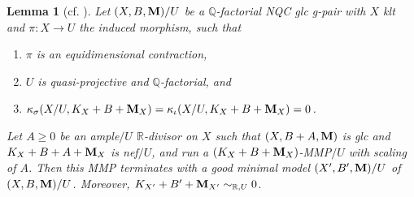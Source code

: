\documentclass[11pt]{amsart}
\numberwithin{equation}{section}
\newcommand{\Mm}{{\bf{M}}}
\newcommand{\Qq}{\mathbb{Q}}
\newcommand{\Rr}{\mathbb{R}}
\newtheorem{lem}[thm]{Lemma}
\theoremstyle{definition}
\theoremstyle{definition}
\theoremstyle{definition}
\begin{document}
\begin{lem}[{cf. \cite[Version 2, Lemma 4.9]{HL21}}]\label{lem: has19 3.2 step 3 abu ver}
Let $(X,B,\Mm)/U$ be a $\Qq$-factorial NQC glc g-pair with $X$ klt and $\pi: X\rightarrow U$ the induced morphism, such that
\begin{enumerate}
\item $\pi$ is an equidimensional contraction,
\item $U$ is quasi-projective and $\Qq$-factorial, and
\item $\kappa_{\sigma}(X/U,K_X+B+\Mm_X)=\kappa_{\iota}(X/U,K_X+B+\Mm_X)=0$.
\end{enumerate}
Let $A\geq 0$ be an ample$/U$ $\Rr$-divisor on $X$ such that $(X,B+A,\Mm)$ is glc and $K_X+B+A+\Mm_X$ is nef$/U$, and run a $(K_X+B+\Mm_X)$-MMP$/U$ with scaling of $A$. Then this MMP terminates with a good minimal model $(X',B',\Mm)/U$ of $(X,B,\Mm)/U$. Moreover, $K_{X'}+B'+\Mm_{X'}\sim_{\Rr,U} 0$.
\end{lem}
\end{document}
